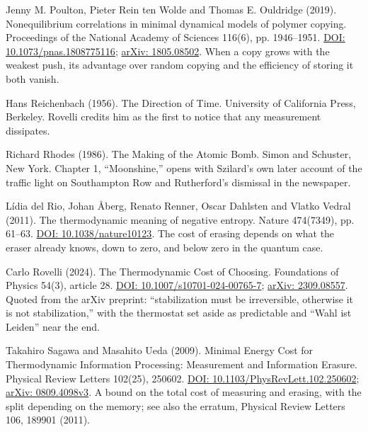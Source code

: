 \documentclass[11pt,twoside]{article}
\theoremstyle{thielethm}
\theoremstyle{thieledef}
\theoremstyle{thieledef}
\theoremstyle{thieledef}
\theoremstyle{thielethm}
\theoremstyle{thieleobs}
\theoremstyle{thielethm}
\begin{document}
\noindent Jenny M. Poulton, Pieter Rein ten Wolde and Thomas E. Ouldridge (2019). Nonequilibrium correlations in minimal dynamical models of polymer copying. Proceedings of the National Academy of Sciences 116(6), pp. 1946--1951. \href{https://doi.org/10.1073/pnas.1808775116}{DOI: 10.1073/pnas.1808775116}; \href{https://arxiv.org/abs/1805.08502}{arXiv: 1805.08502}. When a copy grows with the weakest push, its advantage over random copying and the efficiency of storing it both vanish.
\par\medskip

\noindent Hans Reichenbach (1956). The Direction of Time. University of California Press, Berkeley. Rovelli credits him as the first to notice that any measurement dissipates.
\par\medskip

\noindent Richard Rhodes (1986). The Making of the Atomic Bomb. Simon and Schuster, New York. Chapter 1, ``Moonshine,'' opens with Szilard's own later account of the traffic light on Southampton Row and Rutherford's dismissal in the newspaper.
\par\medskip

\noindent L\'idia del Rio, Johan \AA{}berg, Renato Renner, Oscar Dahlsten and Vlatko Vedral (2011). The thermodynamic meaning of negative entropy. Nature 474(7349), pp. 61--63. \href{https://doi.org/10.1038/nature10123}{DOI: 10.1038/nature10123}. The cost of erasing depends on what the eraser already knows, down to zero, and below zero in the quantum case.
\par\medskip

\noindent Carlo Rovelli (2024). The Thermodynamic Cost of Choosing. Foundations of Physics 54(3), article 28. \href{https://doi.org/10.1007/s10701-024-00765-7}{DOI: 10.1007/s10701-024-00765-7}; \href{https://arxiv.org/abs/2309.08557}{arXiv: 2309.08557}. Quoted from the arXiv preprint: ``stabilization must be irreversible, otherwise it is not stabilization,'' with the thermostat set aside as predictable and ``Wahl ist Leiden'' near the end.
\par\medskip

\noindent Takahiro Sagawa and Masahito Ueda (2009). Minimal Energy Cost for Thermodynamic Information Processing: Measurement and Information Erasure. Physical Review Letters 102(25), 250602. \href{https://doi.org/10.1103/PhysRevLett.102.250602}{DOI: 10.1103/PhysRevLett.102.250602}; \href{https://arxiv.org/abs/0809.4098v3}{arXiv: 0809.4098v3}. A bound on the total cost of measuring and erasing, with the split depending on the memory; see also the erratum, Physical Review Letters 106, 189901 (2011).
\par\medskip
\end{document}
